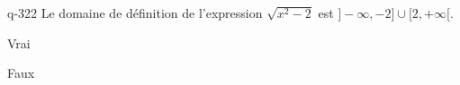 \begin{truefalse}{q-322}
Le domaine de définition de l'expression $\sqrt{x^2-2}$ est $]-\infty,-2]\cup [2,+\infty[$.
\item Vrai
\item* Faux
\end{truefalse}

